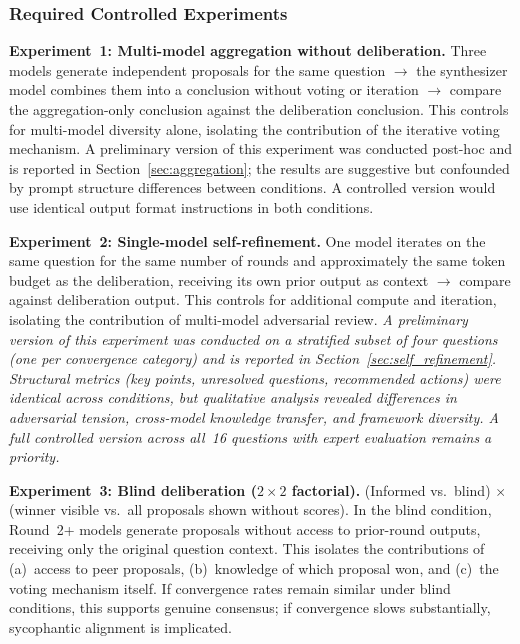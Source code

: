 \documentclass[11pt,a4paper]{article}
\begin{document}
\subsubsection{Required Controlled Experiments}

\textbf{Experiment~1: Multi-model aggregation without deliberation.} Three models generate independent proposals for the same question $\rightarrow$ the synthesizer model combines them into a conclusion without voting or iteration $\rightarrow$ compare the aggregation-only conclusion against the deliberation conclusion. This controls for multi-model diversity alone, isolating the contribution of the iterative voting mechanism. A preliminary version of this experiment was conducted post-hoc and is reported in Section~\ref{sec:aggregation}; the results are suggestive but confounded by prompt structure differences between conditions. A controlled version would use identical output format instructions in both conditions.

\textbf{Experiment~2: Single-model self-refinement.} One model iterates on the same question for the same number of rounds and approximately the same token budget as the deliberation, receiving its own prior output as context $\rightarrow$ compare against deliberation output. This controls for additional compute and iteration, isolating the contribution of multi-model adversarial review. \emph{A preliminary version of this experiment was conducted on a stratified subset of four questions (one per convergence category) and is reported in Section~\ref{sec:self_refinement}. Structural metrics (key points, unresolved questions, recommended actions) were identical across conditions, but qualitative analysis revealed differences in adversarial tension, cross-model knowledge transfer, and framework diversity. A full controlled version across all~16 questions with expert evaluation remains a priority.}

\textbf{Experiment~3: Blind deliberation ($2\times2$ factorial).} (Informed vs.\ blind) $\times$ (winner visible vs.\ all proposals shown without scores). In the blind condition, Round~2+ models generate proposals without access to prior-round outputs, receiving only the original question context. This isolates the contributions of (a)~access to peer proposals, (b)~knowledge of which proposal won, and (c)~the voting mechanism itself. If convergence rates remain similar under blind conditions, this supports genuine consensus; if convergence slows substantially, sycophantic alignment is implicated.
\end{document}
